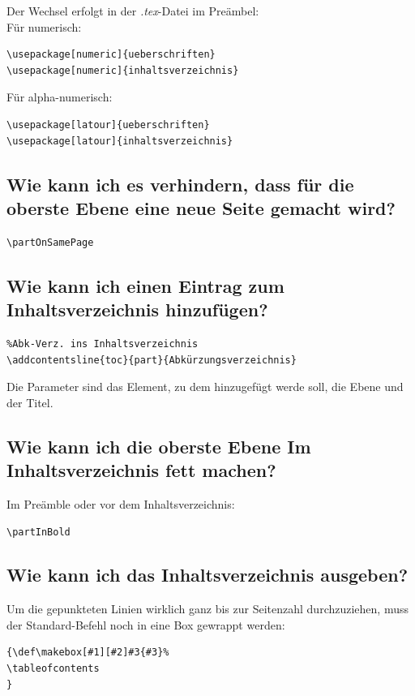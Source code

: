 \documentclass[12pt]{article}
\begin{document}
Der Wechsel erfolgt in der \textit{.tex}-Datei im Preämbel:\\[6pt]
Für numerisch:
\begin{verbatim}
\usepackage[numeric]{ueberschriften}
\usepackage[numeric]{inhaltsverzeichnis}
\end{verbatim}
Für alpha-numerisch:
\begin{verbatim}
\usepackage[latour]{ueberschriften}
\usepackage[latour]{inhaltsverzeichnis}
\end{verbatim}

\subsection{Wie kann ich es verhindern, dass für die oberste Ebene eine neue Seite gemacht wird?}
\begin{verbatim}
\partOnSamePage
\end{verbatim}

\subsection{Wie kann ich einen Eintrag zum Inhaltsverzeichnis hinzufügen?}
\begin{verbatim}
%Abk-Verz. ins Inhaltsverzeichnis
\addcontentsline{toc}{part}{Abkürzungsverzeichnis}
\end{verbatim}
Die Parameter sind das Element, zu dem hinzugefügt werde soll, die Ebene und der Titel.

\subsection{Wie kann ich die oberste Ebene Im Inhaltsverzeichnis fett machen?}
Im Preämble oder vor dem Inhaltsverzeichnis:
\begin{verbatim}
\partInBold
\end{verbatim}

\subsection{Wie kann ich das Inhaltsverzeichnis ausgeben?}
Um die gepunkteten Linien wirklich ganz bis zur Seitenzahl durchzuziehen, muss der Standard-Befehl noch in eine Box gewrappt werden:
\begin{verbatim}
{\def\makebox[#1][#2]#3{#3}%
\tableofcontents
}
\end{verbatim}
\end{document}
